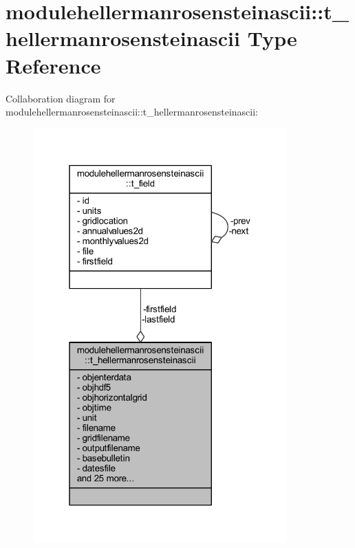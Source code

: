 \hypertarget{structmodulehellermanrosensteinascii_1_1t__hellermanrosensteinascii}{}\section{modulehellermanrosensteinascii\+:\+:t\+\_\+hellermanrosensteinascii Type Reference}
\label{structmodulehellermanrosensteinascii_1_1t__hellermanrosensteinascii}


Collaboration diagram for modulehellermanrosensteinascii\+:\+:t\+\_\+hellermanrosensteinascii\+:\nopagebreak
\begin{figure}[H]
\begin{center}
\leavevmode
\includegraphics[width=277pt]{structmodulehellermanrosensteinascii_1_1t__hellermanrosensteinascii__coll__graph}
\end{center}
\end{figure}
